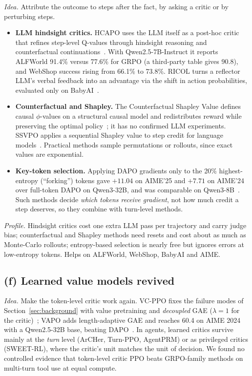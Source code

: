 \emph{Idea.} Attribute the outcome to steps after the fact, by asking a critic or by perturbing steps.
\begin{itemize}
  \item \textbf{LLM hindsight critics.} HCAPO uses the LLM itself as a post-hoc critic that refines step-level Q-values through hindsight reasoning and counterfactual continuations~\citep{tan2026hindsight}. With Qwen2.5-7B-Instruct it reports ALFWorld 91.4\% versus 77.6\% for GRPO (a third-party table gives 90.8), and WebShop success rising from 66.1\% to 73.8\%. RICOL turns a reflector LLM's verbal feedback into an advantage via the shift in action probabilities, evaluated only on BabyAI~\citep{chen2026retrospective}.
  \item \textbf{Counterfactual and Shapley.} The Counterfactual Shapley Value defines causal $\phi$-values on a structural causal model and redistributes reward while preserving the optimal policy~\citep{li2026counterfactual}; it has no confirmed LLM experiments. SSVPO applies a sequential Shapley value to step credit for language models~\citep{ssvpo2026effective}\unverified. Practical methods sample permutations or rollouts, since exact values are exponential.
  \item \textbf{Key-token selection.} Applying DAPO gradients only to the 20\% highest-entropy (``forking'') tokens gave $+11.04$ on AIME'25 and $+7.71$ on AIME'24 over full-token DAPO on Qwen3-32B, and was comparable on Qwen3-8B~\citep{wang2025beyond}. Such methods decide \emph{which tokens receive gradient}, not how much credit a step deserves, so they combine with turn-level methods.
\end{itemize}

\emph{Profile.} Hindsight critics cost one extra LLM pass per trajectory and carry judge bias; counterfactual and Shapley methods need resets and cost about as much as Monte-Carlo rollouts; entropy-based selection is nearly free but ignores errors at low-entropy tokens. Helps on ALFWorld, WebShop, BabyAI and AIME.

\subsection{(f) Learned value models revived}\label{sec:tax-value}

\emph{Idea.} Make the token-level critic work again. VC-PPO fixes the failure modes of Section~\ref{sec:background} with value pretraining and \emph{decoupled} GAE ($\lambda=1$ for the critic)~\citep{yuan2025whats}; VAPO adds length-adaptive GAE and reaches 60.4 on AIME 2024 with a Qwen2.5-32B base, beating DAPO~\citep{yue2025vapo}. In agents, learned critics survive mainly at the \emph{turn} level (ArCHer, Turn-PPO, AgentPRM) or as privileged critics (SWEET-RL), where the critic's unit matches the unit of decision. We found no controlled evidence that token-level critic PPO beats GRPO-family methods on multi-turn tool use at equal compute.

